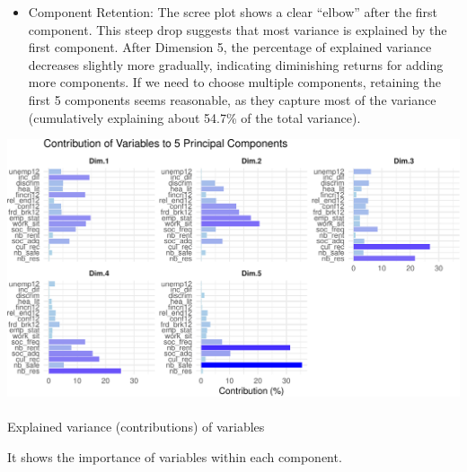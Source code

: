 \documentclass[
]{article}
\makeatletter
\let\oldparagraph\paragraph
\renewcommand{\paragraph}{
    \@ifstar
      \xxxParagraphStar
      \xxxParagraphNoStar
  }
\newcommand{\xxxParagraphStar}[1]{\oldparagraph*{#1}\mbox{}}
\newcommand{\xxxParagraphNoStar}[1]{\oldparagraph{#1}\mbox{}}
\providecommand{\tightlist}{%
  \setlength{\itemsep}{0pt}\setlength{\parskip}{0pt}}\usepackage{longtable,booktabs,array}
\makeatother
\begin{document}
\begin{itemize}
\tightlist
\item
  Component Retention: The scree plot shows a clear ``elbow'' after the
  first component. This steep drop suggests that most variance is
  explained by the first component. After Dimension 5, the percentage of
  explained variance decreases slightly more gradually, indicating
  diminishing returns for adding more components. If we need to choose
  multiple components, retaining the first 5 components seems
  reasonable, as they capture most of the variance (cumulatively
  explaining about 54.7\% of the total variance).
\end{itemize}

\begin{center}
\includegraphics{draft_v3_files/figure-pdf/unnamed-chunk-16-1.pdf}
\end{center}

\paragraph{Explained variance (contributions) of
variables}\label{explained-variance-contributions-of-variables}

It shows the importance of variables within each component.
\end{document}
